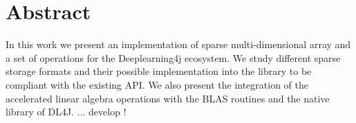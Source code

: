

\cleardoublepage
\chapter*{Abstract}
In this work we present an implementation of sparse multi-dimensional array and a set of operations for the Deeplearning4j ecosystem. We study different sparse storage formats and their possible implementation into the library to be compliant with the existing API. We also present the integration of the accelerated linear algebra operations with the BLAS routines and the native library of DL4J.
... develop !

\vskip0.5cm




